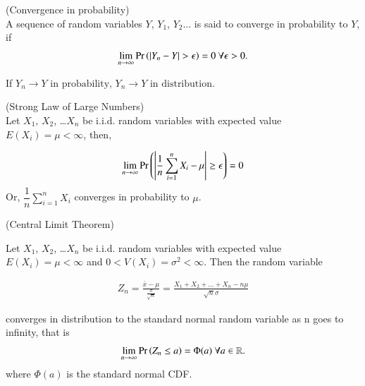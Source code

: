 \documentclass[journal,12pt,twocolumn]{IEEEtran}
\begin{document}
\begin{definition}
    (Convergence in probability)\\
    A sequence of random variables $Y$, $Y_1$, $Y_2 \ldots$ is said to converge in probability to $Y$, if
    \begin{align}
        \lim_{n \to \infty}\Pr\left(\vert Y_n - Y\vert > \epsilon\right) = 0  \text{  }\forall \epsilon > 0.
    \end{align}
\end{definition}

\begin{lemma}
    If
    \begin{math}
    {Y_n} \to Y \text{ in probability, }{Y_n} \to Y \text{ in distribution.}
    \end{math}
\end{lemma}


\begin{lemma}
    (Strong Law of Large Numbers)\\ 
Let $X_1$, $X_2$, \ldots $X_n$ be i.i.d. random variables with expected value $E(X_i)=\mu < \infty$, then,

\begin{align}
    \lim_{n \to \infty}\Pr\left(\left|\dfrac{1}{n}\sum_{i=1}^n X_i - \mu \right|\geq \epsilon\right)=0
\end{align}
Or, 
\begin{math}
    \dfrac{1}{n}\sum_{i=1}^n X_i
\end{math}
converges in probability to $\mu$.
\end{lemma}

\begin{lemma}
    (Central Limit Theorem)

Let $X_1$, $X_2$, \ldots $X_n$ be i.i.d. random variables with expected value $E(X_i)=\mu < \infty$  and $0 < V(X_i)=\sigma^2 < \infty$. Then the random variable 

\begin{align}
    Z_n = \frac{\bar{x} - \mu}{\frac{\sigma}{\sqrt{n}}} = \frac{X_1 + X_2 + \ldots + X_n - n\mu}{\sqrt{n}\sigma}
\end{align}

converges in distribution to the standard normal random variable as n goes to infinity, that is
\begin{align}
    \lim_{n \to \infty}\Pr\left(Z_n \leq a\right) = \Phi(a)   \text{        }\forall a \in \mathbb{R}.
\end{align}
where $\Phi(a)$ is the standard normal CDF.
\end{lemma}
\end{document}
